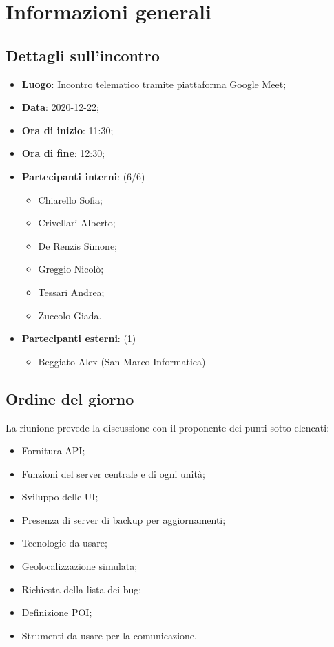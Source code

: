 \section{Informazioni generali}

\subsection{Dettagli sull'incontro}
\begin{itemize}
\item \textbf{Luogo}: Incontro telematico tramite piattaforma Google Meet;
\item \textbf{Data}: 2020-12-22;
\item \textbf{Ora di inizio}: 11:30;
\item \textbf{Ora di fine}: 12:30;
\item \textbf{Partecipanti interni}: (6/6) 
\begin{itemize}
	\item Chiarello Sofia;
	\item Crivellari Alberto;
	\item De Renzis Simone;
	\item Greggio Nicolò;
	\item Tessari Andrea;
	\item Zuccolo Giada.
\end{itemize}
\item \textbf{Partecipanti esterni}: (1) 
\begin{itemize}
	\item Beggiato Alex (San Marco Informatica)
\end{itemize}
\end{itemize}

\subsection{Ordine del giorno}

La riunione prevede la discussione con il proponente dei punti sotto elencati:
\begin{itemize}
	\item Fornitura API;
	\item Funzioni del server centrale e di ogni unità;
	\item Sviluppo delle UI;
	\item Presenza di server di backup per aggiornamenti;
	\item Tecnologie da usare;
	\item Geolocalizzazione simulata;
	\item Richiesta della lista dei bug;
	\item Definizione POI;
	\item Strumenti da usare per la comunicazione.
\end{itemize}




